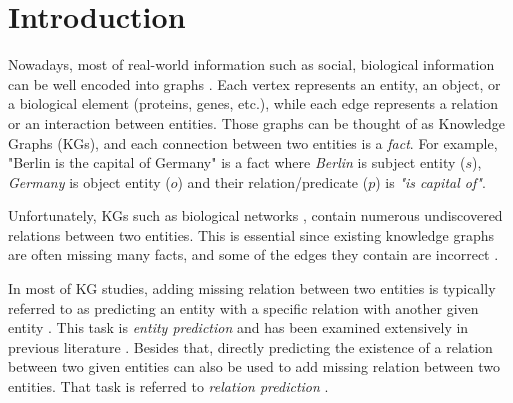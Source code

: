 \chapter{Introduction}
\label{cha:intro}
Nowadays, most of real-world information such as social, biological information can be well encoded into graphs \citep{lu2011link}. Each vertex represents an entity, an object, or a biological element (proteins, genes, etc.), while each edge represents a relation or an interaction between entities. Those graphs can be thought of as Knowledge Graphs (KGs), and each connection between two entities is a \textit{fact}. For example, "Berlin is the capital of Germany" is a fact where \textit{Berlin} is subject entity ($s$), \textit{Germany} is object entity ($o$) and their relation/predicate ($p$) is \textit{"is capital of"}.

Unfortunately, KGs such as biological networks \citep{amaral2008truer, stumpf2008estimating, yu2008high}, contain numerous undiscovered relations between two entities. This is essential since existing knowledge graphs are often missing many facts, and some of the edges they contain are incorrect \citep{angeli2013philosophers}. 

In most of KG studies, adding missing relation between two entities is typically referred to as predicting an entity with a specific relation with another given entity \citep{wang2017knowledge}. This task is \textit{entity prediction} \citep{lin2015modeling} and has been examined extensively in previous literature \citep{bordes2013translating, lin2015learning, nickel2016holographic, wang2014knowledge}. Besides that, directly predicting the existence of a relation between two given entities can also be used to add missing relation between two entities. That task is referred to \textit{relation prediction} \citep{lin2015modeling, xie2016representation}. 

